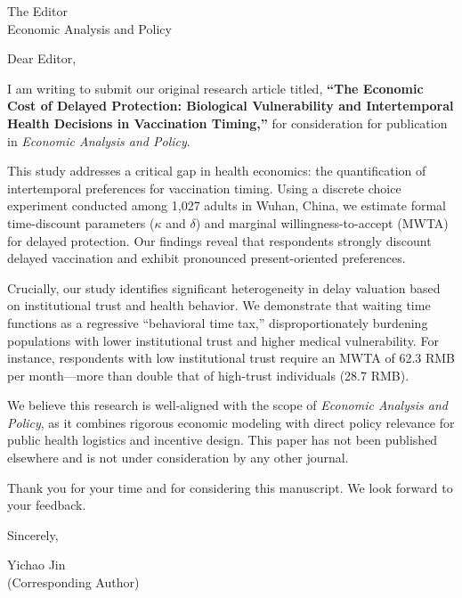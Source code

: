 \documentclass[12pt]{letter}
\begin{document}
\begin{letter}{The Editor \\ Economic Analysis and Policy}

\opening{Dear Editor,}

I am writing to submit our original research article titled, \textbf{``The Economic Cost of Delayed Protection: Biological Vulnerability and Intertemporal Health Decisions in Vaccination Timing,''} for consideration for publication in \textit{Economic Analysis and Policy}.

This study addresses a critical gap in health economics: the quantification of intertemporal preferences for vaccination timing. Using a discrete choice experiment conducted among 1,027 adults in Wuhan, China, we estimate formal time-discount parameters ($\kappa$ and $\delta$) and marginal willingness-to-accept (MWTA) for delayed protection. Our findings reveal that respondents strongly discount delayed vaccination and exhibit pronounced present-oriented preferences. 

Crucially, our study identifies significant heterogeneity in delay valuation based on institutional trust and health behavior. We demonstrate that waiting time functions as a regressive ``behavioral time tax,'' disproportionately burdening populations with lower institutional trust and higher medical vulnerability. For instance, respondents with low institutional trust require an MWTA of 62.3 RMB per month—more than double that of high-trust individuals (28.7 RMB). 

We believe this research is well-aligned with the scope of \textit{Economic Analysis and Policy}, as it combines rigorous economic modeling with direct policy relevance for public health logistics and incentive design. This paper has not been published elsewhere and is not under consideration by any other journal. 

Thank you for your time and for considering this manuscript. We look forward to your feedback.

\closing{Sincerely,}

\vspace{1em}
\noindent Yichao Jin \\
(Corresponding Author)

\end{letter}
\end{document}
